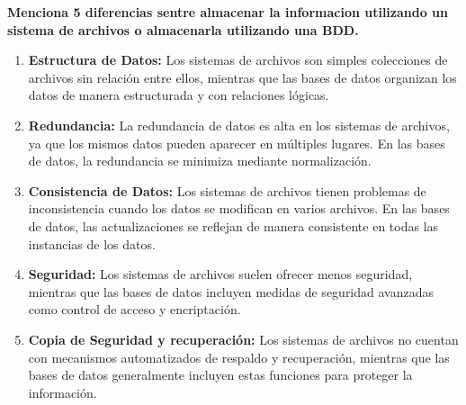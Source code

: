 \begin{center}
    \textbf{Menciona 5 diferencias sentre almacenar la informacion utilizando un sistema de archivos o almacenarla utilizando una BDD.}
\end{center}

\begin{enumerate}
    \item \textbf{Estructura de Datos:} Los sistemas de archivos son simples colecciones de archivos sin relación entre ellos, mientras que             las bases de datos organizan los datos de manera estructurada y con relaciones lógicas.
    \item \textbf{Redundancia:} La redundancia de datos es alta en los sistemas de archivos, ya que los mismos datos pueden aparecer en                 múltiples lugares. En las bases de datos, la redundancia se minimiza mediante normalización.
    \item \textbf{Consistencia de Datos:} Los sistemas de archivos tienen problemas de inconsistencia cuando los datos se modifican en                 varios archivos. En las bases de datos, las actualizaciones se reflejan de manera consistente en todas las instancias de los datos.
    \item \textbf{Seguridad:} Los sistemas de archivos suelen ofrecer menos seguridad, mientras que las bases de datos incluyen medidas de             seguridad avanzadas como control de acceso y encriptación. 
    \item \textbf{Copia de Seguridad y recuperación:} Los sistemas de archivos no cuentan con mecanismos automatizados de respaldo y                     recuperación, mientras que las bases de datos generalmente incluyen estas funciones para proteger la información.\\
\end{enumerate}
\cite{guru99, sooluciona}

\vspace{.5cm}


